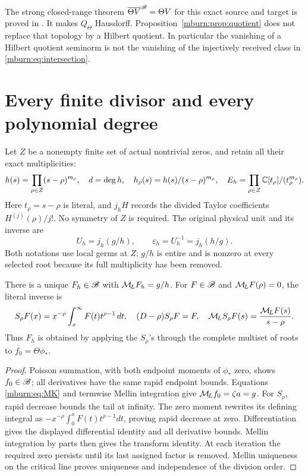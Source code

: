 The strong closed-range theorem $\overline{\Theta V}^{\mathscr B}=\Theta V$
for this exact source and target is proved in \cite{mburn:ClosedTheta}.
It makes $Q_\Theta$ Hausdorff. Proposition~\ref{mburn:prop:quotient}
does not replace that topology by a Hilbert quotient. In particular
the vanishing of a Hilbert quotient seminorm is not the vanishing
of the injectively received class in \eqref{mburn:eq:intersection}.

\section{Every finite divisor and every polynomial degree}

Let $Z$ be a nonempty finite set of actual nontrivial zeros, and
retain all their exact multiplicities:
\begin{equation}\label{mburn:eq:h}
 h(s)=\prod_{\rho\in Z}(s-\rho)^{m_\rho},\quad d=\deg h,
 \quad h_\rho(s)=h(s)/(s-\rho)^{m_\rho},\quad
 E_h=\prod_{\rho\in Z}\mathbb C[t_\rho]/(t_\rho^{m_\rho}).
\end{equation}
Here $t_\rho=s-\rho$ is literal, and $j_hH$ records the divided
Taylor coefficients $H^{(j)}(\rho)/j!$. No symmetry of $Z$ is
required. The original physical unit and its inverse are
\begin{equation}\label{mburn:eq:unit}
 U_h=j_h(g/h),\qquad \varepsilon_h=U_h^{-1}=j_h(h/g).
\end{equation}
Both notations use local germs at $Z$; $g/h$ is entire and is
nonzero at every selected root because its full multiplicity
has been removed.

\begin{mburnlemma}\label{mburn:lem:Fh}
There is a unique $F_h\in\mathscr B$ with $\mathcal M_{\!L} F_h=g/h$.
For $F\in\mathscr B$ and $\mathcal M_{\!L} F(\rho)=0$, the literal inverse is
\[
 S_\rho F(x)=x^{-\rho}\int_x^\infty F(t)t^{\rho-1}\,dt,
 \quad(D-\rho)S_\rho F=F,\quad
 \mathcal M_{\!L} S_\rho F(s)=\frac{\mathcal M_{\!L} F(s)}{s-\rho}.
\]
Thus $F_h$ is obtained by applying the $S_\rho$'s through
the complete multiset of roots to $f_0=\Theta\phi_*$.
\end{mburnlemma}
\begin{proof}
Poisson summation, with both endpoint moments of $\phi_*$ zero,
shows $f_0\in\mathscr B$; all derivatives have the same rapid endpoint
bounds. Equations \eqref{mburn:eq:MK} and termwise Mellin integration
give $\mathcal M_{\!L} f_0=\zeta a=g$. For $S_\rho$, rapid decrease bounds
the tail at infinity. The zero moment rewrites its defining
integral as $-x^{-\rho}\int_0^xF(t)t^{\rho-1}dt$, proving rapid
decrease at zero. Differentiation gives the displayed differential
identity and all derivative bounds. Mellin integration by parts
then gives the transform identity. At each iteration the required
zero persists until its last assigned factor is removed.
Mellin uniqueness on the critical line proves uniqueness and
independence of the division order.
\end{proof}

